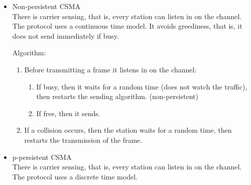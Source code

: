 \documentclass[margin=0px]{article}
\begin{document}
\begin{description}
\begin{description}
\begin{itemize}
\begin{itemize}
                                    Algorithm:
                                    \begin{enumerate}
                                        \item Before transmitting a frame it listens in on the channel:
                                              \begin{enumerate}
                                                  \item If busy, then it waits until it is freed. In case of a free channel it sends immediately. (persistent)
                                                  \item If free, then it sends.
                                              \end{enumerate}
                                        \item If a collision occurs, then the station waits for a random time, then restarts the transmission of the frame.
                                    \end{enumerate}
                              \item Non-persistent CSMA \\
                                    There is carrier sensing, that is, every station can listen in on the channel. The protocol uses a continuous time model. It avoids greediness, that is, it does not send immediately if busy.

                                    Algorithm:
                                    \begin{enumerate}
                                        \item Before transmitting a frame it listens in on the channel:
                                              \begin{enumerate}
                                                  \item If busy, then it waits for a random time (does not watch the traffic), then restarts the sending algorithm. (non-persistent)
                                                  \item If free, then it sends.
                                              \end{enumerate}
                                        \item If a collision occurs, then the station waits for a random time, then restarts the transmission of the frame.
                                    \end{enumerate}
                              \item p-persistent CSMA \\
                                    There is carrier sensing, that is, every station can listen in on the channel. The protocol uses a discrete time model.


\end{itemize}
\end{itemize}
\end{description}
\end{description}
\end{document}
